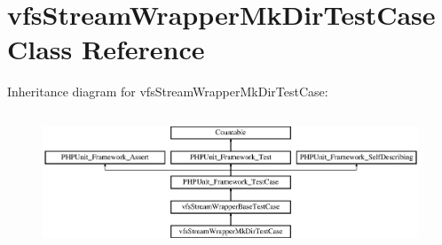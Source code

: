 \hypertarget{classorg_1_1bovigo_1_1vfs_1_1vfs_stream_wrapper_mk_dir_test_case}{}\section{vfs\+Stream\+Wrapper\+Mk\+Dir\+Test\+Case Class Reference}
\label{classorg_1_1bovigo_1_1vfs_1_1vfs_stream_wrapper_mk_dir_test_case}
Inheritance diagram for vfs\+Stream\+Wrapper\+Mk\+Dir\+Test\+Case\+:\begin{figure}[H]
\begin{center}
\leavevmode
\includegraphics[height=4.129793cm]{classorg_1_1bovigo_1_1vfs_1_1vfs_stream_wrapper_mk_dir_test_case}
\end{center}
\end{figure}
